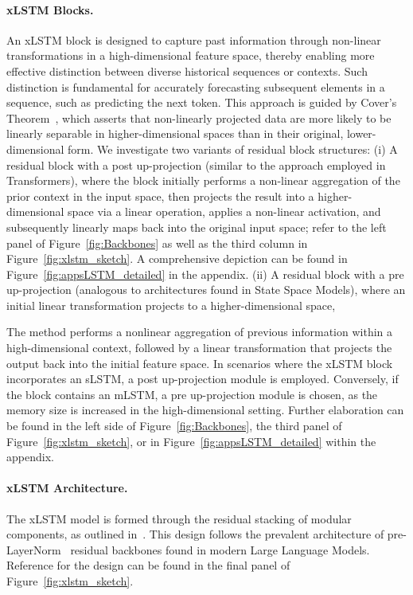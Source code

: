 \paragraph{xLSTM Blocks.}
\label{sec:xLSTMblock}
An xLSTM block is designed to capture past information through non-linear transformations in a high-dimensional feature space, thereby enabling more effective distinction between diverse historical sequences or contexts. Such distinction is fundamental for accurately forecasting subsequent elements in a sequence, such as predicting the next token. This approach is guided by Cover’s Theorem~\citep{Cover:65}, which asserts that non-linearly projected data are more likely to be linearly separable in higher-dimensional spaces than in their original, lower-dimensional form. We investigate two variants of residual block structures: (i) A residual block with a post up-projection (similar to the approach employed in Transformers), where the block initially performs a non-linear aggregation of the prior context in the input space, then projects the result into a higher-dimensional space via a linear operation, applies a non-linear activation, and subsequently linearly maps back into the original input space; refer to the left panel of Figure~\ref{fig:Backbones}
as well as the third column in Figure~\ref{fig:xlstm_sketch}. 
A comprehensive depiction can be found in Figure~\ref{fig:appsLSTM_detailed}
in the appendix. (ii) A residual block with a pre up-projection (analogous to architectures found in State Space Models), where an initial linear transformation projects to a higher-dimensional space,

The method performs a nonlinear aggregation of previous information within a high-dimensional context, followed by a linear transformation that projects the output back into the initial feature space. In scenarios where the xLSTM block incorporates an sLSTM, a post up-projection module is employed. Conversely, if the block contains an mLSTM, a pre up-projection module is chosen, as the memory size is increased in the high-dimensional setting. Further elaboration can be found in the left side of Figure~\ref{fig:Backbones}, the third panel of Figure~\ref{fig:xlstm_sketch}, or in Figure~\ref{fig:appsLSTM_detailed} within the appendix.

\paragraph{xLSTM Architecture. }
\label{sec:xLSTMarchitecure}
The xLSTM model is formed through the residual stacking of modular components, as outlined in~\citep{Srivastava:15,He:16}. This design follows the prevalent architecture of pre-LayerNorm~\citep{Ba:16b} residual backbones found in modern Large Language Models. Reference for the design can be found in the final panel of Figure~\ref{fig:xlstm_sketch}.

